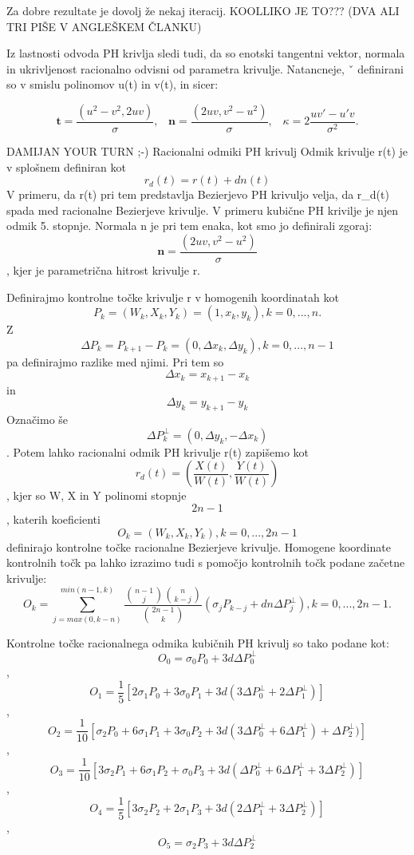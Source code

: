 Za dobre rezultate je dovolj že nekaj iteracij. KOOLLIKO JE TO??? (DVA ALI TRI PIŠE V ANGLEŠKEM ČLANKU)

Iz lastnosti odvoda PH krivlja sledi tudi, da so enotski tangentni vektor,
normala in ukrivljenost racionalno odvisni od parametra krivulje. Natancneje, ˇ
definirani so v smislu polinomov u(t) in v(t), in sicer: 

$$\textbf{t} =\frac{(u^2 - v^2, 2uv)}{\sigma},\hspace{10pt} \textbf{n} =\frac{(2uv, v^2 - u^2)}{\sigma},\hspace{10pt} \kappa = 2 \frac{uv\prime - u\prime v}{\sigma^2}.$$


DAMIJAN YOUR TURN ;-)
Racionalni odmiki PH krivulj
Odmik krivulje r(t) je v splošnem definiran kot
$$ r_d(t) = r(t) + dn(t)$$
V primeru, da r(t) pri tem predstavlja Bezierjevo PH krivuljo velja, 
da r_d(t) spada med racionalne Bezierjeve krivulje. V primeru kubične PH krivilje 
je njen odmik 5. stopnje. Normala n je pri tem enaka, kot smo jo definirali zgoraj:
$$\textbf{n} =\frac{(2uv, v^2 - u^2)}{\sigma}$$,
kjer je \sigma parametrična hitrost krivulje r.

Definirajmo kontrolne točke krivulje r v homogenih koordinatah kot
$$ P_k = (W_k, X_k, Y_k) = (1, x_k, y_k), k = 0, ..., n.$$
Z $$\Delta P_k = P_{k+1}-P_k = (0, \Delta x_k, \Delta y_k), k = 0, ..., n-1$$ 
pa definirajmo razlike med njimi. Pri tem so $$\Delta x_k = x_{k+1} - x_k$$ in $$\Delta y_k = y_{k+1} - y_k$$
Označimo še $$ \Delta P_k^{\perp} = (0, \Delta y_k, - \Delta x_k)$$. Potem lahko
racionalni odmik PH krivulje r(t) zapišemo kot
$$ r_d(t) = (\frac{X(t)}{W(t)}, \frac{Y(t)}{W(t)})$$,
kjer so W, X in Y polinomi stopnje $$2n -1$$, katerih koeficienti 
$$ O_k = (W_k, X_k, Y_k), k = 0, ..., 2n-1$$
definirajo kontrolne točke racionalne Bezierjeve krivulje. 
Homogene koordinate kontrolnih točk pa lahko izrazimo tudi s pomočjo kontrolnih točk podane začetne krivulje:
$$ O_k = \sum_{j=max(0,k-n)}^{min(n-1,k)}{\frac{\binom{n-1}{j}\binom{n}{k-j}}{\binom{2n-1}{k}}(\sigma_j P_{k-j}+d n \Delta P^{\perp}_{j})}, k = 0, ..., 2n-1.$$

Kontrolne točke racionalnega odmika kubičnih PH krivulj so tako podane kot:
$$ O_0 = \sigma_0 P_0 + 3 d \Delta P_0^{\perp}$$,
$$ O_1 = \frac{1}{5} [2 \sigma_1 P_0 + 3\sigma_0 P_1 + 3 d (3 \Delta P_0^{\perp} + 2 \Delta P_1^{\perp})]$$,
$$ O_2 = \frac{1}{10} [\sigma_2 P_0 + 6\sigma_1 P_1 + 3\sigma_0 P_2 + 3 d (3 \Delta P_0^{\perp} + 6 \Delta P_1^{\perp}) + \Delta P_2^{\perp})]$$,
$$ O_3 = \frac{1}{10} [3\sigma_2 P_1 + 6\sigma_1 P_2 + \sigma_0 P_3 + 3 d (\Delta P_0^{\perp} + 6 \Delta P_1^{\perp} + 3 \Delta P_2^{\perp})]$$,
$$ O_4 = \frac{1}{5} [3\sigma_2 P_2 + 2\sigma_1 P_3 + 3 d (2\Delta P_1^{\perp} + 3 \Delta P_2^{\perp})]$$,
$$ O_5 = \sigma_2 P_3 + 3 d \Delta P_2^{\perp}$$


